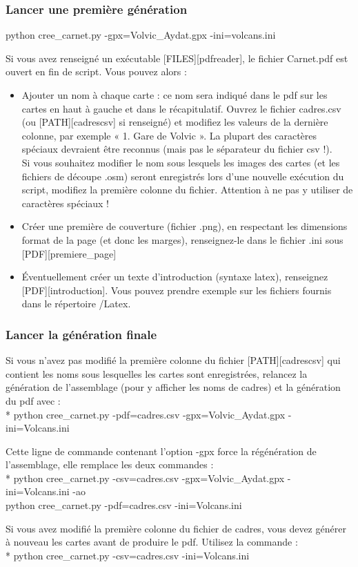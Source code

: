 \documentclass[12pt,french]{article}
\begin{document}
\subsubsection{Lancer une première génération}
python cree\_carnet.py -gpx=Volvic\_Aydat.gpx -ini=volcans.ini \par
Si vous avez renseigné un exécutable [FILES][pdfreader], le fichier Carnet.pdf est ouvert en fin de script. Vous pouvez alors :
\begin{itemize}
\item Ajouter un nom à chaque carte : ce nom sera indiqué dans le pdf sur les cartes en haut à gauche et dans le récapitulatif. Ouvrez le fichier cadres.csv (ou [PATH][cadrescsv] si renseigné) et modifiez les valeurs de la dernière colonne, par exemple « 1. Gare de Volvic ». La plupart des caractères spéciaux devraient être reconnus (mais pas le séparateur du fichier csv !). \\Si vous souhaitez modifier le nom sous lesquels les images des cartes (et les fichiers de découpe .osm) seront enregistrés lors d'une nouvelle exécution du script, modifiez la première colonne du fichier. Attention à ne pas y utiliser de caractères spéciaux !
\item Créer une première de couverture (fichier .png), en respectant les dimensions format de la page (et donc les marges), renseignez-le dans le fichier .ini sous [PDF][premiere\_page]
\item Éventuellement créer un texte d'introduction (syntaxe latex), renseignez [PDF][introduction]. Vous pouvez prendre exemple sur les fichiers fournis dans le répertoire /Latex.
\end{itemize}

\subsubsection{Lancer la génération finale}
Si vous n'avez pas modifié la première colonne du fichier [PATH][cadrescsv] qui contient les noms sous lesquelles les cartes sont enregistrées, relancez la génération de l'assemblage (pour y afficher les noms de cadres) et la génération du pdf avec : \\*
python cree\_carnet.py -pdf=cadres.csv -gpx=Volvic\_Aydat.gpx -ini=Volcans.ini \par 
Cette ligne de commande contenant l'option -gpx force la régénération de l'assemblage, elle remplace les deux commandes : \\*
python cree\_carnet.py -csv=cadres.csv -gpx=Volvic\_Aydat.gpx -ini=Volcans.ini -ao \\
python cree\_carnet.py -pdf=cadres.csv -ini=Volcans.ini \par
Si vous avez modifié la première colonne du fichier de cadres, vous devez générer à nouveau les cartes avant de produire le pdf. Utilisez la commande :\\*
python cree\_carnet.py -csv=cadres.csv -ini=Volcans.ini \par
\end{document}
